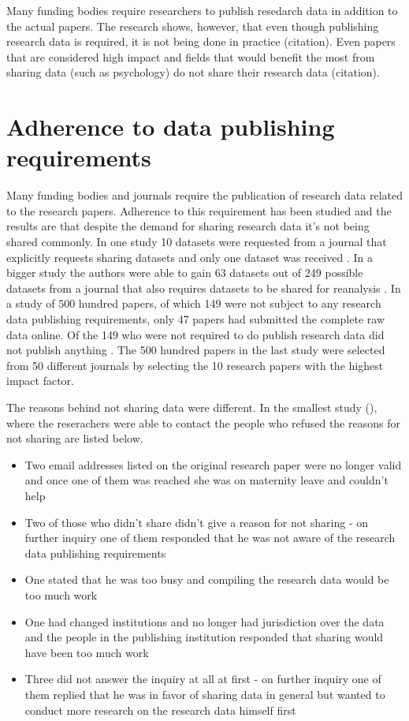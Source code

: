 Many funding bodies require researchers to publish resedarch data in addition
to the actual papers. The research shows, however, that even though publishing
research data is required, it is not being done in practice (citation). Even
papers that are considered high impact and fields that would benefit the most
from sharing data (such as psychology) do not share their research data
(citation).

\fi

\section{Adherence to data publishing requirements}

Many funding bodies and journals require the publication of research data
related to the research papers. Adherence to this requirement has been studied
and the results are that despite the demand for sharing research data it's not
being shared commonly. In one study 10 datasets were requested from a journal
that explicitly requests sharing datasets and only one dataset was received
\cite{savage2009empirical}. In a bigger study the authors were able to gain
63 datasets out of 249 possible datasets from a journal that also requires
datasets to be shared for reanalysis \cite{wicherts2006poor}. In a study of
500 hundred papers, of which 149 were not subject to any research data
publishing requirements, only 47 papers had submitted the complete raw data
online. Of the 149 who were not required to do publish research data did not
publish anything \cite{alsheikh2011public}. The 500 hundred papers in the last
study were selected from 50 different journals by selecting the 10 research
papers with the highest impact factor.

The reasons behind not sharing data were different. In the smallest study (\cite{savage2009empirical}),
where the reserachers were able to contact the people who refused the reasons
for not sharing are listed below.

\begin{itemize}
    \item Two email addresses listed on the original research paper were no
          longer valid and once one of them was reached she was on maternity
          leave and couldn't help
    \item Two of those who didn't share didn't give a reason for not sharing - on further
          inquiry one of them responded that he was not aware of the research
          data publishing requirements
    \item One stated that he was too busy and compiling the research data
          would be too much work
    \item One had changed institutions and no longer had jurisdiction over the
          data and the people in the publishing institution responded that
          sharing would have been too much work
    \item Three did not answer the inquiry at all at first - on further inquiry
          one of them replied that he was in favor of sharing data in general
          but wanted to conduct more research on the research data himself
          first
\end{itemize}

